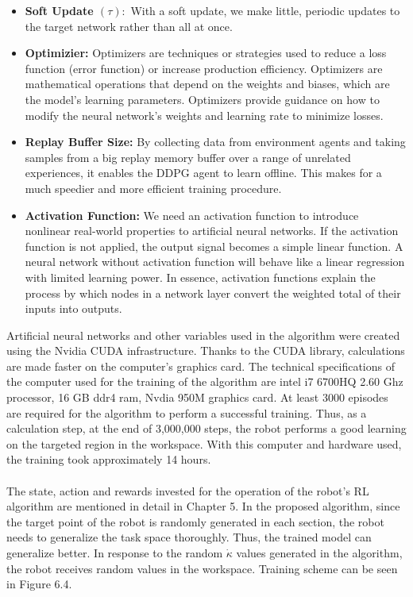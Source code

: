 \documentclass[12pt,twoside,a4]{mwbk}
\begin{document}
\begin{itemize}
    \item \textbf{Soft Update $(\tau):$} With a soft update, we make little, periodic updates to the target network rather than all at once.
    
    \item \textbf{Optimizier:} Optimizers are techniques or strategies used to reduce a loss function (error function) or increase production efficiency. Optimizers are mathematical operations that depend on the weights and biases, which are the model's learning parameters. Optimizers provide guidance on how to modify the neural network's weights and learning rate to minimize losses.
    
    \item \textbf{Replay Buffer Size:} By collecting data from environment agents and taking samples from a big replay memory buffer over a range of unrelated experiences, it enables the DDPG agent to learn offline. This makes for a much speedier and more efficient training procedure.
    
    \item \textbf{Activation Function:} We need an activation function to introduce nonlinear real-world properties to artificial neural networks. If the activation function is not applied, the output signal becomes a simple linear function. A neural network without activation function will behave like a linear regression with limited learning power. In essence, activation functions explain the process by which nodes in a network layer convert the weighted total of their inputs into outputs.
\end{itemize}
Artificial neural networks and other variables used in the algorithm were created using the Nvidia CUDA infrastructure. Thanks to the CUDA library, calculations are made faster on the computer's graphics card. The technical specifications of the computer used for the training of the algorithm are intel i7 6700HQ 2.60 Ghz processor, 16 GB ddr4 ram, Nvdia 950M graphics card. At least 3000 episodes are required for the algorithm to perform a successful training. Thus, as a calculation step, at the end of 3,000,000 steps, the robot performs a good learning on the targeted region in the workspace. With this computer and hardware used, the training took approximately 14 hours.
\\ \\
The state, action and rewards invested for the operation of the robot's RL algorithm are mentioned in detail in Chapter 5. In the proposed algorithm, since the target point of the robot is randomly generated in each section, the robot needs to generalize the task space thoroughly. Thus, the trained model can generalize better. In response to the random $\dot{\kappa}$ values generated in the algorithm, the robot receives random values in the workspace. Training scheme can be seen in Figure 6.4.
\end{document}
